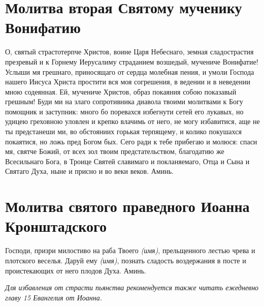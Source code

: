 \section{Молитва вторая Святому мученику Вонифатию}\begin{mymulticols}

О, святый страстотерпче Христов, воине Царя Небеснаго, земная сладострастия презревый и к Горнему Иерусалиму страданием возшедый, мучениче Вонифатие! Услыши мя грешнаго, приносящаго от сердца молебная пения, и умоли Господа нашего Иисуса Христа простити вся моя согрешения, в ведении и в неведении мною содеянная. Ей, мучениче Христов, образ покаяния собою показавый грешным! Буди ми на злаго сопротивника диавола твоими молитвами к Богу помощник и заступник: много бо поревахся избегнути сетей его лукавых, но удицею греховною уловлен и крепко влачимь от него, не могу избавитися, аще не ты предстанеши ми, во обстояниих горькая терпящему, и колико покушахся покаятися, но ложь пред Богом бых. Сего ради к тебе прибегаю и молюся: спаси мя, святче Божий, от всех зол твоим предстательством, благодатию же Всесильнаго Бога, в Троице Святей славимаго и покланяемаго, Отца и Сына и Святаго Духа, ныне и присно и во веки веков. Аминь. 

\end{mymulticols}

\section{Молитва святого праведного Иоанна Кронштадского}\begin{mymulticols}

Господи, призри милостиво на раба Твоего {\itshape(имя)}, прельщенного лестью чрева и плотского веселья. Даруй ему {\itshape(имя)}, познать сладость воздержания в посте и проистекающих от него плодов Духа. Аминь.

{\itshape Для избавления от страсти пьянства рекомендуется также читать ежедневно главу 15 Евангелия от Иоанна.}

\end{mymulticols}


